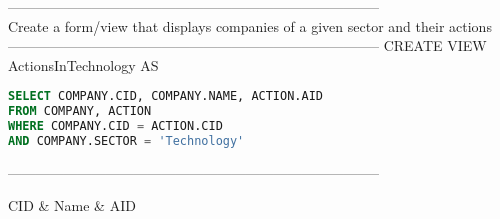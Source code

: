 --------------------------------------------------------------------------------
\\Create a form/view that displays companies of a given sector and their actions\\
--------------------------------------------------------------------------------
CREATE VIEW ActionsInTechnology AS 
\begin{lstlisting}[language = SQL]
SELECT COMPANY.CID, COMPANY.NAME, ACTION.AID
FROM COMPANY, ACTION
WHERE COMPANY.CID = ACTION.CID
AND COMPANY.SECTOR = 'Technology'
\end{lstlisting}
--------------------------------------------------------------------------------\\\begin{tabular}{}
\toprule
 CID   & Name   & AID   \\
\midrule
\bottomrule
\end{tabular}